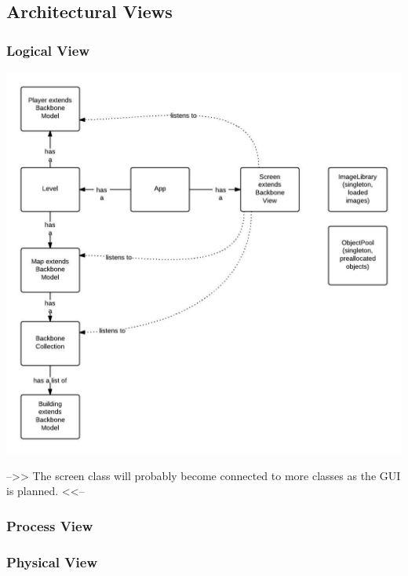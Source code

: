 \subsection{Architectural Views}

\subsubsection{Logical View} %

\includegraphics[width=\textwidth]{pictures/class_diagram}

-->> The screen class will probably become connected to more classes as the GUI is planned. <<--

\subsubsection{Process View} %

\subsubsection{Physical View} %

